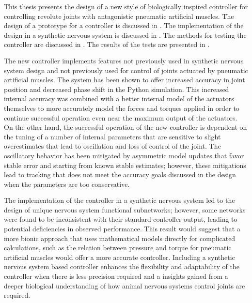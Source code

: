 
This thesis presents the design of a new style of biologically inspired
controller for controlling revolute joints with antagonistic pneumatic
artificial muscles. The
design of a prototype for a controller is discussed in
. The implementation of the design in a
synthetic nervous system is discussed in . The methods
for testing the controller are discussed in . The results of
the tests are presented in .

The new controller implements features not previously used in synthetic nervous
system design and not previously used for control of joints actuated by
pneumatic artificial muscles. The system has been shown to offer
increased accuracy in joint position and decreased phase shift in the Python simulation. This increased internal accuracy was
combined with a better internal model of the actuators themselves to more
accurately model the forces and torques applied in order to continue successful
operation even near the maximum output of the actuators. On the other hand, the
successful operation of the new controller is dependent on the tuning of a number of
internal parameters that are sensitive to slight overestimates that lead to
oscillation and loss of control of the joint. The oscillatory behavior has been mitigated by
asymmetric model updates that favor stable error and starting from known stable
estimates; however, these mitigations lead to tracking that does not meet the accuracy goals
discussed in the design when the parameters are too conservative.

The implementation of the controller in a synthetic nervous system led to the
design of unique nervous system functional subnetworks; however, some networks
were found to be inconsistent with their standard controller output, leading to
potential deficiencies in observed performance. This result would suggest that a more
bionic approach that uses mathematical models directly for complicated
calculations, such as the relation between pressure and torque for pneumatic
artificial muscles would offer a more accurate controller. Including a synthetic nervous system based controller enhances the flexibility and adaptability of the controller when there is less precision required and a insights gained from a deeper biological understanding of how animal nervous systems control joints are required.



